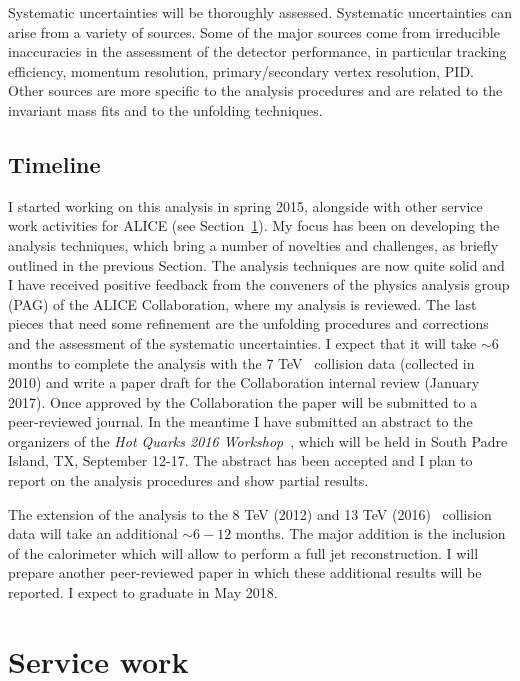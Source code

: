 \documentclass[12pt, a4paper, twoside, titlepage]{article}
\begin{document}
Systematic uncertainties will be thoroughly assessed. Systematic uncertainties can arise from a variety of sources.
Some of the major sources come from irreducible inaccuracies in the assessment of the detector performance, in particular tracking efficiency, 
momentum resolution, primary/secondary vertex resolution, PID.
Other sources are more specific to the analysis procedures and are related to the invariant mass fits and to the unfolding techniques.

\subsection{Timeline}
I started working on this analysis in spring 2015, alongside with other service work activities for ALICE (see Section~\ref{sect:ServiceWork}).
My focus has been on developing the analysis techniques, which bring a number of novelties and challenges, as briefly outlined in the previous Section.
The analysis techniques are now quite solid and I have received positive feedback from the conveners of the physics analysis group (PAG) of the ALICE Collaboration,
where my analysis is reviewed. The last pieces that need some refinement are the unfolding procedures and corrections and the assessment of the systematic uncertainties.
I expect that it will take $\sim 6$ months to complete the analysis with the 7 TeV \pp\ collision data (collected in 2010) and write a paper draft for the Collaboration internal review (January 2017). Once approved
by the Collaboration the paper will be submitted to a peer-reviewed journal.
In the meantime I have submitted an abstract to the organizers of the \emph{Hot Quarks 2016 Workshop}~\cite{HotQuarks:2016}, which will be held in South Padre Island, TX, September 12-17. 
The abstract has been accepted and I plan to report on the analysis procedures and show partial results.

The extension of the analysis to the 8 TeV (2012) and 13 TeV (2016) \pp\ collision data will take an additional $\sim 6-12$ months. The major addition is the inclusion of the calorimeter
which will allow to perform a full jet reconstruction.
I will prepare another peer-reviewed paper in which these additional results will be reported.
I expect to graduate in May 2018.

\section{Service work}
\label{sect:ServiceWork}
\end{document}
